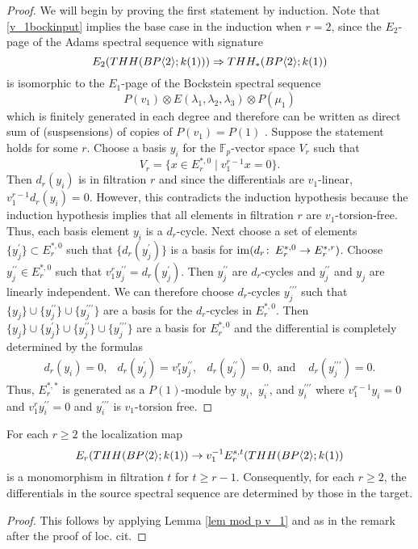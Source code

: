 \begin{proof}
We will begin by proving the first statement by induction. Note that \eqref{v_1bockinput} implies the base case in the induction when $r=2$, since the $E_2$-page of the Adams spectral sequence with signature
\[ E_2(THH(BP\langle 2 \rangle;k(1)))\Rightarrow THH_*(BP\langle 2 \rangle;k(1))\]
is isomorphic to the $E_1$-page of the Bockstein spectral sequence 
\[ P(v_1) \otimes E(\lambda_1 ,\lambda_2, \lambda_3) \otimes P(\mu_1) \]
which is finitely generated in each degree and therefore can be written as direct sum of (suspsensions) of copies of $P(v_1)=P(1)$ . 
Suppose the statement holds for some $r$. Choose a basis $y_i$ for the $\mathbb{F}_p$-vector space $V_r$ such that 
\[V_r=\{ x \in E_r^{*,0}\mid v_1^{r-1}x=0\}.\] 
Then $d_r(y_i)$ is in filtration $r$ and since the differentials are $v_1$-linear, $v_1^{r-1}d_r(y_i)=0$. However, this contradicts the induction hypothesis because the induction hypothesis implies that all elements in filtration $r$ are $v_1$-torsion-free. Thus, each basis element $y_i$ is a $d_r$-cycle. Next choose a set of elements $\{y^{\prime}_j\}\subset E_r^{*,0}$ such that $\{d_r(y_j^{\prime})\}$ is a basis for $\operatorname{im}(d_r\colon \thinspace E_r^{*,0}\to E_r^{*,r})$. Choose $y^{\prime\prime}_j\in E_r^{*,0}$ such that $v_1^{r}y^{\prime\prime}_j=d_r(y_j^{\prime})$. Then $y^{\prime\prime}_j$ are $d_r$-cycles and $y^{\prime \prime}_j$ and $y_j$ are linearly independent. We can therefore choose $d_r$-cycles $y^{\prime \prime\prime}_j$ such that $\{y_j\}\cup\{y_j^{\prime\prime}\}\cup\{y_j^{\prime\prime\prime}\}$ are a basis for the $d_r$-cycles in $E_{r}^{*,0}$. Then 
$\{y_j\}\cup\{y_j^{\prime}\}\cup \{y_j^{\prime\prime}\}\cup\{y_j^{\prime\prime\prime}\}$
are a basis for $E_r^{*,0}$ and the differential is completely determined by the formulas
\[ \begin{array}{cccc} d_r(y_i)=0 , &d_r(y_j^{\prime})=v_1^{r}y_j^{\prime \prime}, & d_r(y_j^{\prime \prime})=0, \text{ and } & d_r(y_j^{\prime \prime \prime})=0. \end{array}\]
Thus, $E_r^{*,*}$ is generated as a $P(1)$-module by $y_i,$ $y_i^{\prime \prime}$, and $y_i^{\prime \prime\prime}$ where $v_1^{r-1}y_i=0$ and $v_1^ry_i^{\prime \prime}=0$ and $y_i^{\prime \prime \prime}$ is $v_1$-torsion free. 
\end{proof}
\begin{cor}\label{mod p v_n}
For each $r\ge 2$ the localization map 
\[ E_r(THH(BP\langle 2 \rangle;k(1)) \to v_1^{-1}E_r^{s,t}(THH(BP\langle 2 \rangle;k(1))\]
is a monomorphism in filtration $t$ for $t\ge r-1$. Consequently, for each $r\ge 2$, the differentials in the source spectral sequence are determined by those in the target. 
\end{cor}
\begin{proof}
This follows by applying Lemma \ref{lem mod p v_1} and \cite[Thm. 7.1]{McClureStaffeldt} as in the remark after the proof of loc. cit.
\end{proof}

